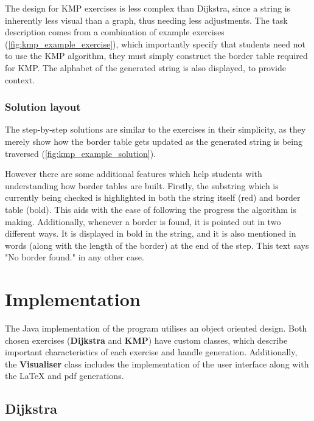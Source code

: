 \documentclass{l4proj}
\begin{document}
The design for KMP exercises is less complex than Dijkstra, since a string is inherently less visual than a graph, thus needing less adjustments. The task description comes from a combination of example exercises  (\autoref{fig:kmp_example_exercise}), which importantly specify that students need not to use the KMP algorithm, they must simply construct the border table required for KMP. The alphabet of the generated string is also displayed, to provide context.

\subsection{Solution layout}
\label{sec:KMPSolutionDesign}

The step-by-step solutions are similar to the exercises in their simplicity, as they merely show how the border table gets updated as the generated string is being traversed (\autoref{fig:kmp_example_solution}).

However there are some additional features which help students with understanding how border tables are built. Firstly, the substring which is currently being checked is highlighted in both the string itself (red) and border table (bold). This aids with the ease of following the progress the algorithm is making. Additionally, whenever a border is found, it is pointed out in two different ways. It is displayed in bold in the string, and it is also mentioned in words (along with the length of the border) at the end of the step. This text says "No border found." in any other case.

\chapter{Implementation}
\label{chap:imp}

The Java implementation of the program utilises an object oriented design. Both chosen exercises (\textbf{Dijkstra} and \textbf{KMP}) have custom classes, which describe important characteristics of each exercise and handle generation. Additionally, the \textbf{Visualiser} class includes the implementation of the user interface along with the LaTeX and pdf generations.

\section{Dijkstra}
\end{document}
